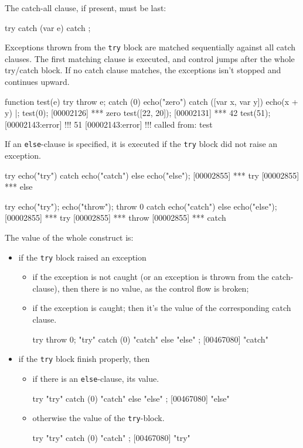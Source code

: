 \noindent
The catch-all clause, if present, must be last:

\begin{urbiscript}
try {} catch (var e) {} catch {};
\end{urbiscript}

Exceptions thrown from the \lstinline|try| block are matched sequentially
against all catch clauses. The first matching clause is executed, and
control jumps after the whole try/catch block. If no catch clause matches,
the exceptions isn't stopped and continues upward.

\begin{urbiscript}
function test(e)
{
  try
  { throw e;  }
  catch (0)
  { echo("zero") }
  catch ([var x, var y])
  { echo(x + y) }
}|;
test(0);
[00002126] *** zero
test([22, 20]);
[00002131] *** 42
test(51);
[00002143:error] !!! 51
[00002143:error] !!!    called from: test
\end{urbiscript}

If an \lstinline|else|-clause is specified, it is executed if the
\lstinline|try| block did not raise an exception.

\begin{urbiscript}
try   { echo("try") }
catch { echo("catch")}
else  { echo("else")};
[00002855] *** try
[00002855] *** else

try   { echo("try"); echo("throw"); throw 0 }
catch { echo("catch")}
else  { echo("else")};
[00002855] *** try
[00002855] *** throw
[00002855] *** catch
\end{urbiscript}

The value of the whole construct is:
\begin{itemize}
\item if the \lstinline|try| block raised an exception
  \begin{itemize}
  \item if the exception is not caught (or an exception is thrown from the
    catch-clause), then there is no value, as the control flow is broken;
  \item if the exception is caught; then it's the value of the corresponding
    catch clause.
\begin{urbiscript}
try { throw 0; "try" } catch (0) { "catch" } else { "else" };
[00467080] "catch"
\end{urbiscript}
  \end{itemize}
\item if the \lstinline|try| block finish properly, then
  \begin{itemize}
  \item if there is an \lstinline|else|-clause, its value.
\begin{urbiscript}
try { "try" } catch (0) { "catch" } else { "else" };
[00467080] "else"
\end{urbiscript}
  \item otherwise the value of the \lstinline|try|-block.
\begin{urbiscript}
try { "try" } catch (0) { "catch" };
[00467080] "try"
\end{urbiscript}
  \end{itemize}
\end{itemize}



